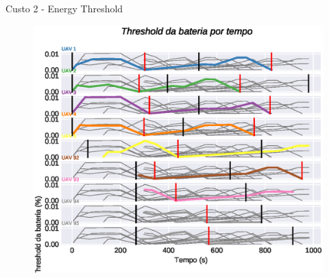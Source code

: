 \begin{frame}{Custo 2 - Energy Threshold}
            \begin{figure}[!htb]
                 \includegraphics[width=\textwidth]{custo_2/uav_energy_threshold_.eps}
             \end{figure}
        \end{frame}